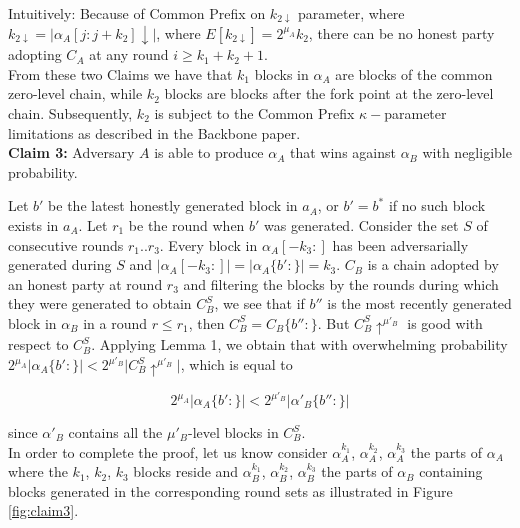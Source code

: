 \documentclass[11pt,a4paper]{article}
\begin{document}
Intuitively: Because of Common Prefix on $k_{2\downarrow}$ parameter, where $k_{2\downarrow} = \vert \alpha_A[j:j+k_2]\downarrow\vert$, where $E[k_{2\downarrow}] = 2^{\mu_A}k_2$, there can be no honest party adopting $C_A$ at any round $i \geq k_1 + k_2 + 1$. \\

From these two Claims we have that $k_1$ blocks in $\alpha_A$ are blocks of the common zero-level chain, while $k_2$ blocks are blocks after the fork point at the zero-level chain. Subsequently, $k_2$ is subject to the Common Prefix $\kappa-$parameter limitations as described in the Backbone paper\cite{Backbone}.\\

\textbf{Claim 3:} Adversary $A$ is able to produce $\alpha_A$ that wins against $\alpha_B$ with negligible probability.

Let $b'$ be the latest honestly generated block in $a_A$, or $b' = b^*$ if no such block exists in $a_A$. Let $r_1$ be the round when $b'$ was generated. Consider the set $S$ of consecutive rounds $r_1..r_3$. Every block in $\alpha_A[-k_3:]$ has been adversarially generated during $S$ and $\vert \alpha_A[-k_3:] \vert = \vert \alpha_A\{b':\} \vert = k_3$. $C_B$ is a chain adopted by an honest party at round $r_3$ and filtering the blocks by the rounds during which they were generated to obtain $C_B^S$, we see that if $b''$ is the most recently generated block in $\alpha_B$ in a round $r \leq r_1$, then $C_B^S = C_B\{ b'': \}$. But $C_B^S \uparrow^{\mu'_B}$ is good with respect to $C_B^S$. Applying Lemma 1, we obtain that with overwhelming probability  $2^{\mu_A} \vert \alpha_A\{b':\} \vert < 2^{\mu'_B} \vert C_B^S \uparrow^{\mu'_B} \vert$, which is equal to

\begin{equation}
2^{\mu_A} \vert \alpha_A\{b':\} \vert < 2^{\mu'_B} \vert \alpha'_B\{b'':\} \vert
\end{equation} 

since $\alpha'_B$ contains all the $\mu'_B$-level blocks in $C_B^S$. \\


In order to complete the proof, let us know consider $\alpha_A^{k_1}$, $\alpha_A^{k_2}$, $\alpha_A^{k_3}$ the parts of $\alpha_A$ where the $k_1$, $k_2$, $k_3$ blocks reside and 
$\alpha_B^{k_1}$, $\alpha_B^{k_2}$, $\alpha_B^{k_3}$ the parts of $\alpha_B$ containing blocks generated in the corresponding round sets as illustrated in Figure \ref{fig:claim3}.
\end{document}
